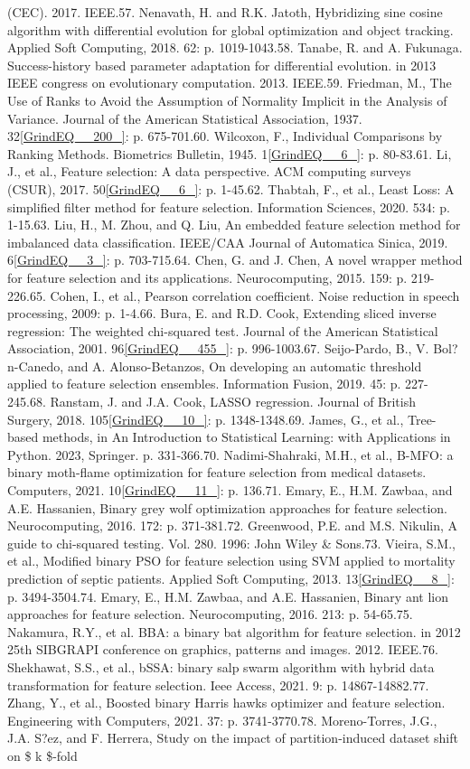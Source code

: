 \documentclass{article} %
\begin{document}
(CEC). 2017. IEEE.57. Nenavath, H. and R.K. Jatoth, Hybridizing sine cosine algorithm with differential evolution for global optimization and object tracking. Applied Soft Computing, 2018. 62: p. 1019-1043.58. Tanabe, R. and A. Fukunaga. Success-history based parameter adaptation for differential evolution. in 2013 IEEE congress on evolutionary computation. 2013. IEEE.59. Friedman, M., The Use of Ranks to Avoid the Assumption of Normality Implicit in the Analysis of Variance. Journal of the American Statistical Association, 1937. 32\eqref{GrindEQ__200_}: p. 675-701.60. Wilcoxon, F., Individual Comparisons by Ranking Methods. Biometrics Bulletin, 1945. 1\eqref{GrindEQ__6_}: p. 80-83.61. Li, J., et al., Feature selection: A data perspective. ACM computing surveys (CSUR), 2017. 50\eqref{GrindEQ__6_}: p. 1-45.62. Thabtah, F., et al., Least Loss: A simplified filter method for feature selection. Information Sciences, 2020. 534: p. 1-15.63. Liu, H., M. Zhou, and Q. Liu, An embedded feature selection method for imbalanced data classification. IEEE/CAA Journal of Automatica Sinica, 2019. 6\eqref{GrindEQ__3_}: p. 703-715.64. Chen, G. and J. Chen, A novel wrapper method for feature selection and its applications. Neurocomputing, 2015. 159: p. 219-226.65. Cohen, I., et al., Pearson correlation coefficient. Noise reduction in speech processing, 2009: p. 1-4.66. Bura, E. and R.D. Cook, Extending sliced inverse regression: The weighted chi-squared test. Journal of the American Statistical Association, 2001. 96\eqref{GrindEQ__455_}: p. 996-1003.67. Seijo-Pardo, B., V. Bol?n-Canedo, and A. Alonso-Betanzos, On developing an automatic threshold applied to feature selection ensembles. Information Fusion, 2019. 45: p. 227-245.68. Ranstam, J. and J.A. Cook, LASSO regression. Journal of British Surgery, 2018. 105\eqref{GrindEQ__10_}: p. 1348-1348.69. James, G., et al., Tree-based methods, in An Introduction to Statistical Learning: with Applications in Python. 2023, Springer. p. 331-366.70. Nadimi-Shahraki, M.H., et al., B-MFO: a binary moth-flame optimization for feature selection from medical datasets. Computers, 2021. 10\eqref{GrindEQ__11_}: p. 136.71. Emary, E., H.M. Zawbaa, and A.E. Hassanien, Binary grey wolf optimization approaches for feature selection. Neurocomputing, 2016. 172: p. 371-381.72. Greenwood, P.E. and M.S. Nikulin, A guide to chi-squared testing. Vol. 280. 1996: John Wiley \& Sons.73. Vieira, S.M., et al., Modified binary PSO for feature selection using SVM applied to mortality prediction of septic patients. Applied Soft Computing, 2013. 13\eqref{GrindEQ__8_}: p. 3494-3504.74. Emary, E., H.M. Zawbaa, and A.E. Hassanien, Binary ant lion approaches for feature selection. Neurocomputing, 2016. 213: p. 54-65.75. Nakamura, R.Y., et al. BBA: a binary bat algorithm for feature selection. in 2012 25th SIBGRAPI conference on graphics, patterns and images. 2012. IEEE.76. Shekhawat, S.S., et al., bSSA: binary salp swarm algorithm with hybrid data transformation for feature selection. Ieee Access, 2021. 9: p. 14867-14882.77. Zhang, Y., et al., Boosted binary Harris hawks optimizer and feature selection. Engineering with Computers, 2021. 37: p. 3741-3770.78. Moreno-Torres, J.G., J.A. S?ez, and F. Herrera, Study on the impact of partition-induced dataset shift on \$ k \$-fold 
\end{document}
